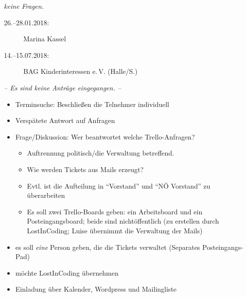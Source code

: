 \begin{Protokoll}
      \emph{keine Fragen.}
      
    \begin{description}
        \item[26.--28.01.2018:] Marina Kassel
        \item[14.--15.07.2018:] BAG  Kinderinteressen e.\,V. (Halle/S.)
    \end{description}
    
    \emph{-- Es sind keine Anträge eingegangen. --}
    
    \begin{itemize}
        \item Terminsuche: Beschließen die Telnehmer individuell
    \end{itemize}
    
    \begin{itemize}
        \item Verspätete Antwort auf Anfragen
        \item Frage/Diskussion: Wer beantwortet welche Trello-Anfragen? 
        \begin{itemize}
            \item Auftrennung politisch/die Verwaltung betreffend.
            \item Wie werden Tickets aus Mails erzeugt? 
            \item Evtl. ist die Aufteilung in "`Vorstand"' und "`NÖ Vorstand"' zu überarbeiten
            \item Es soll zwei Trello-Boards geben: ein Arbeitsboard und ein Posteingangsboard; beide sind nichtöffentlich (zu erstellen durch LostInCoding; Luise übernimmt die Verwaltung der Mails)
        \end{itemize}
    \end{itemize}
        
    \begin{itemize}
        \item es soll \emph{eine} Person geben, die die Tickets verwaltet (Separates Posteingangs-Pad)
    \end{itemize}
    
    
            
    \begin{itemize}
        \item möchte LostInCoding übernehmen
        \item Einladung über Kalender, Wordpress und Mailingliste
    \end{itemize}
    

\end{Protokoll}
